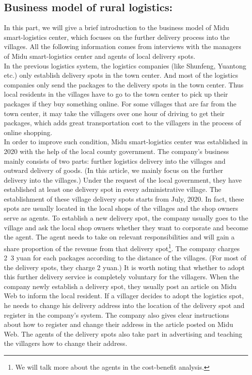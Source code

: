 \documentclass{article}
\begin{document}
\subsection{Business model of rural logistics:}
In this part, we will give a brief introduction to the business model of Midu smart-logistics center, which focuses on the further delivery process into the villages. All the following information comes from interviews with the managers of Midu smart-logistics center and agents of local delivery spots.\\
\mbox{\hspace{2em}}
In the previous logistics system, the logistics companies (like Shunfeng, Yuantong etc.) only establish delivery spots in the town center. And most of the logistics companies only send the packages to the delivery spots in the town center. Thus local residents in the villages have to go to the town center to pick up their packages if they buy something online. For some villages that are far from the town center, it may take the villagers over one hour of driving to get their packages, which adds great transportation cost to the villagers in the process of online shopping.\\
\mbox{\hspace{2em}}
In order to improve such condition, Midu smart-logistics center was established in 2020 with the help of the local county government. The company’s business mainly consists of two parts: further logistics delivery into the villages and outward delivery of goods. (In this article, we mainly focus on the further delivery into the villages.) Under the request of the local government, they have established at least one delivery spot in every administrative village. The establishment of these village delivery spots starts from July, 2020. In fact, these spots are usually located in the local shops of the villages and the shop owners serve as agents. To establish a new delivery spot, the company usually goes to the village and ask the local shop owners whether they want to corporate and become the agent. The agent needs to take on relevant responsibilities and will gain a share proportion of the revenue from that delivery spot\footnote{We will talk more about the agents in the cost-benefit analysis.}. The company charges 2~3 yuan for each packages according to the distance of the villages. (For most of the delivery spots, they charge 2 yuan.) It is worth noting that whether to adopt this further delivery service is completely voluntary for the villagers. When the company newly establish a delivery spot, they usually post an article on Midu Web to inform the local resident. If a villager decides to adopt the logistics spot, he needs to change his delivery address into the location of the delivery spot and register in the company’s system. The company also gives clear instructions about how to register and change their address in the article posted on Midu Web. The agents of the delivery spots also take part in advertising and teaching the villagers how to change their address.\\
\end{document}
